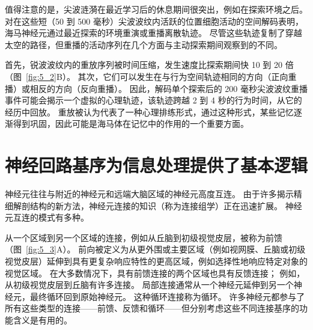 值得注意的是，尖波涟漪在最近学习后的休息期间很突出，例如在探索环境之后。
对在这些短（50 到 500 毫秒）尖波波纹内活跃的位置细胞活动的空间解码表明，海马神经元通过最近探索的环境重演或重播离散轨迹。
尽管这些轨迹复制了穿越太空的路径，但重播的活动序列在几个方面与主动探索期间观察到的不同。


首先，锐波波纹内的重放序列被时间压缩，发生速度比探索期间快 10 到 20 倍（图~\ref{fig:5_2}B）。 
其次，它们可以发生在与行为空间轨迹相同的方向（正向重播）或相反的方向（反向重播）。
因此，解码单个探索后的 200 毫秒尖波波纹重播事件可能会揭示一个虚拟的心理轨迹，该轨迹跨越 2 到 4 秒的行为时间，从它的经历中回放。
重放被认为代表了一种心理排练形式，通过这种形式，某些记忆逐渐得到巩固，因此可能是海马体在记忆中的作用的一个重要方面。



\section{神经回路基序为信息处理提供了基本逻辑}

神经元往往与附近的神经元和远端大脑区域的神经元高度互连。
由于许多揭示精细解剖结构的新方法，神经元连接的知识（称为连接组学）正在迅速扩展。
神经元互连的模式有多种。


从一个区域到另一个区域的连接，例如从丘脑到初级视觉皮层，被称为前馈（图~\ref{fig:5_3}A）。 
前向被定义为从更外围或主要区域（例如视网膜、丘脑或初级视觉皮层）延伸到具有更复杂响应特性的更高区域，例如选择性地响应特定对象的视觉区域。
在大多数情况下，具有前馈连接的两个区域也具有反馈连接；
例如，从初级视觉皮层到丘脑有许多连接。
局部连接通常从一个神经元延伸到另一个神经元，最终循环回到原始神经元。
这种循环连接称为循环。
许多神经元都参与了所有这些类型的连接——前馈、反馈和循环——但分别考虑这些不同连接基序的功能含义是有用的。


